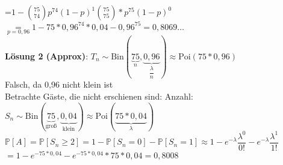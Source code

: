 =$1-\binom{75}{74}p^{74}(1-p)^1\binom{75}{75}*p^{75}(1-p)^0$\smallskip\\
$\underset{p = 0,96}{=} 1- 75*0,96^{74}*0,04-0,96^{75}=0,8069\dots$\medskip\\
\textbf{Lösung 2 (Approx)}: $T_n \sim \text{Bin}(\underbrace{75}_n,\underbrace{0,96}_{\dfrac{\lambda}{n}})  \approx \text{Poi}(75*0,96)$\smallskip\\
Falsch, da 0,96 nicht klein ist\medskip\\
Betrachte Gäste, die nicht erschienen sind: Anzahl:\smallskip\\
$S_n \sim \text{Bin}(\underbrace{75}_\text{groß},\underbrace{0,04}_\text{klein}) \approx \text{Poi}(\underbrace{75*0,04}_\lambda)$\medskip\\
$\mathds{P}[A] = \mathds{P}[S_n \geq 2] = 1- \mathds{P}[S_n = 0] - \mathds{P}[S_n = 1] \approx 1- e ^{-\lambda}\dfrac{\lambda^0}{0!}-e ^{-\lambda}\dfrac{\lambda^1}{1!}$\smallskip\\
$=1-e^{-75*0,04}-e^{-75*0,04}*75*0,04=0,8008$
